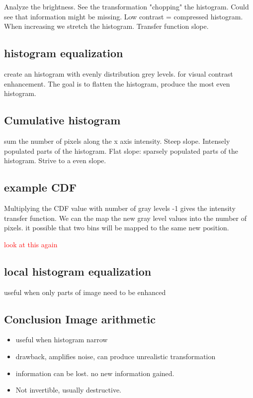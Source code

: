 Analyze the brightness. See the transformation "chopping" the histogram. Could see that information might be missing. Low contrast = compressed histogram. When increasing we stretch the histogram. Transfer function slope. 

\subsection*{histogram equalization}
create an histogram with evenly distribution grey levels. for visual contrast enhancement. The goal is to flatten the histogram, produce the most even histogram. 

\subsection*{Cumulative histogram}
sum the number of pixels along the x axis intensity.
Steep slope. Intensely populated parts of the histogram. Flat slope: sparsely populated parts of the histogram. Strive to a even slope. 

\subsection*{example CDF}
Multiplying the CDF value with  number of gray levels -1 gives the intensity transfer function. We can the map the new gray level values into the number of pixels. it possible that two bins will be mapped to the same new position. 

\textcolor{red}{look at this again}

\subsection*{local histogram equalization}
useful when only parts of image need to be enhanced 

\subsection*{Conclusion Image arithmetic}
\begin{itemize}
    \item useful when histogram narrow
    \item drawback, amplifies noise, can produce unrealistic transformation
    \item information can be lost. no new information gained. 
    \item Not invertible, usually destructive. 
\end{itemize}

